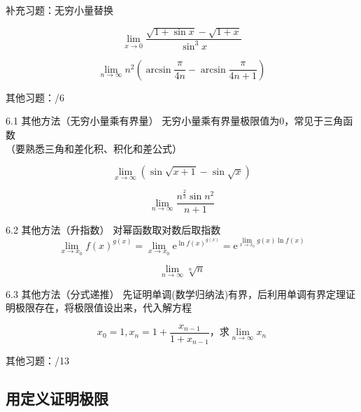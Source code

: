 \documentclass{myslide}
\begin{document}
\begin{frame}{补充习题：无穷小量替换}
\begin{exercise}[17数分期末]
\[\lim_{x\to 0}\frac{\sqrt{1+\sin x}-\sqrt{1+x}}{\sin^3 x}\]
\end{exercise}
\begin{exercise}[17数分期末]
\[\lim_{n\to\infty}n^2\left(\arcsin\frac{\pi}{4n}-\arcsin\frac{\pi}{4n+1}\right)\]
\end{exercise}
其他习题：/6
\end{frame}

\begin{frame}{6.1 其他方法（无穷小量乘有界量）}
无穷小量乘有界量极限值为$0$，常见于三角函数\\
（要熟悉三角和差化积、积化和差公式）
\begin{example}[17数分期中]
\[\lim_{x\to\infty}(\sin\sqrt{x+1}-\sin\sqrt{x})\]
\end{example}
\begin{exercise}[0x高数]
\[\lim_{n\to\infty}\frac{n^\frac{2}{3}\sin n^2}{n+1}\]
\end{exercise}
\end{frame}

\begin{frame}{6.2 其他方法（升指数）}
对幂函数取对数后取指数
\[\lim_{x\to x_0} f(x)^{g(x)}=\lim_{x\to x_0} \mathrm{e}^{\ln f(x)^{g(x)}}=\mathrm{e}^{\lim_{x\to x_0} g(x)\ln f(x)}\]
\begin{example}[\textsection 3.2例13]
\[\lim_{n\to\infty}\sqrt[n]{n}\]
\end{example}
\end{frame}

\begin{frame}{ 6.3 其他方法（分式递推）}
先证明单调(数学归纳法)有界，后利用单调有界定理证明极限存在，将极限值设出来，代入解方程
\begin{example}[\textsection 3.2/13(4)]
\[x_0=1,x_n=1+\frac{x_{n-1}}{1+x_{n-1}}\text{，求}\lim_{n\to\infty}x_n\]
\end{example}
其他习题：/13
\end{frame}

\subsection{用定义证明极限}
\begin{frame}
\subsectionpage
\end{frame}
\end{document}
